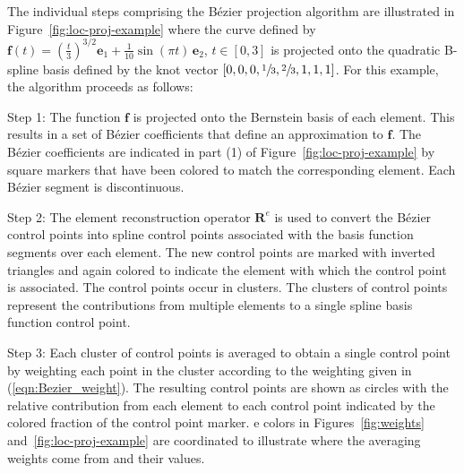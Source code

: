 \documentclass{article}
\renewcommand{\vec}[1]{\boldsymbol{\mathbf{#1}}}
\newcommand{\Bezier}{{B\'{e}zier} }
\begin{document}
The individual steps comprising the \Bezier projection algorithm are
illustrated in Figure~\ref{fig:loc-proj-example} where
the curve defined by $\vec{f}(t)=\left( \frac{t}{3}
\right)^{3/2}\vec{e}_1+\frac{1}{10}\sin (\pi t )\,\vec{e}_2$,
$t\in[0,3]$ is projected onto the quadratic B-spline basis defined by
the knot vector $[0,0,0,\sfrac{1}{3},\sfrac{2}{3},1,1,1]$. For this example,
the algorithm proceeds as follows:

\begin{description}

\item{Step 1:} The function $\mathbf{f}$ is projected onto the Bernstein basis of each element. This results in a set of
  \Bezier coefficients that define an approximation to $\mathbf{f}$.
  The \Bezier coefficients are indicated in part (1) of Figure~\ref{fig:loc-proj-example} by 
  square markers that have been colored to match the corresponding
  element. Each \Bezier segment is discontinuous.

\item{Step 2:} The element reconstruction operator $\mathbf{R}^e$ is used to convert the
  \Bezier control points into spline control points associated with the
  basis function segments over each element.
  The new control points are marked with inverted triangles and
  again colored to indicate the element with which the control point is
  associated. The control points occur in clusters.
  The clusters of control points represent the contributions from
  multiple elements to a single spline basis function control point.

\item{Step 3:} Each cluster of control points is averaged to obtain a
  single control point by weighting each point in the cluster according
  to the weighting given in (\ref{eqn:Bezier_weight}). The resulting control
  points are shown as circles with the relative contribution from each
  element to each control point indicated by the colored fraction of the
  control point marker. e colors in Figures~\ref{fig:weights} and~\ref{fig:loc-proj-example} are coordinated
  to illustrate where the averaging weights come from and their values.
\end{description}
\end{document}
